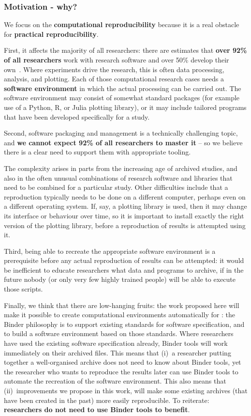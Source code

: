 \subsubsection{Motivation - why?}\label{sec:motivation-why}

We focus on the \textbf{computational reproducibility} because it is a real
obstacle for \textbf{practical reproducibility}.

First, it affects the majority of all researchers: there are estimates that \textbf{over
92\% of all researchers} work with research software and over 50\% develop
their own~\cite{Hettrick2014}. Where experiments drive the research, this is
often data processing, analysis, and plotting. Each of those computational
research cases needs a \textbf{software environment} in which the actual processing can
be carried out. The software environment may consist of somewhat standard
packages (for example use of a Python, R, or Julia plotting library), or it may
include tailored programs that have been developed specifically for a study.

Second, software packaging and management is a technically challenging topic,
and \textbf{we cannot expect 92\% of all researchers to master it} -- so we believe there
is a clear need to support them with appropriate tooling.

The complexity arises in parts from the increasing age of archived studies, and
also in the often unusual combinations of research software and libraries that
need to be combined for a particular study. Other difficulties include that a
reproduction typically needs to be done on a different computer, perhaps even on
a different operating system. If, say, a plotting library is used, then it may
change its interface or behaviour over time, so it is important to install
exactly the right version of the plotting library, before a reproduction of
results is attempted using it.

Third, being able to recreate the appropriate software environment is a
prerequisite before any actual reproduction of results can be attempted: it
would be inefficient to educate researchers what data and programs to archive,
if in the future nobody (or only very few highly trained people) will be able to
execute those scripts.

Finally, we think that there are low-hanging fruits: the work proposed here will
make it possible to create computational environments automatically for
: the Binder philosophy is to support existing standards for software
specification, and to  build a software environment based on those standards.
Where researchers have used the existing software specification already, Binder tools
will work immediately on their archived files. This means that (i)~a researcher
putting together a well-organised archive does not need to know about Binder tools,
yet the researcher who wants to reproduce the results later can use Binder tools to
automate the recreation of the software environment. This also means that
(ii)~improvements we propose in this work, will make some existing archives (that
have been created in the past) more easily reproducible.
To reiterate: \textbf{researchers do not need to use Binder tools to benefit}.


